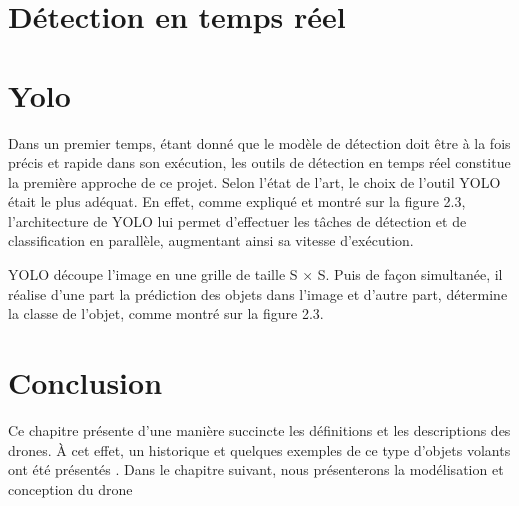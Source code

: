 \section{Détection en temps réel}


\section{Yolo}
Dans un premier temps, étant donné que le modèle de détection doit être à la fois précis et rapide dans son exécution, les outils de détection en temps réel constitue la première approche de ce projet. Selon l’état de l’art, le choix de l’outil YOLO était le plus adéquat. En effet, comme expliqué et montré sur la figure 2.3, l’architecture de YOLO lui permet d’effectuer les tâches de détection et de classification en parallèle, augmentant ainsi sa vitesse d’exécution.

 YOLO découpe l’image en une grille de taille S × S. Puis de façon simultanée, il réalise d’une part la prédiction des objets dans l’image et d’autre part, détermine la classe de l’objet, comme montré sur la figure 2.3.



\section{Conclusion}
Ce chapitre présente d’une manière succincte les définitions et les descriptions des drones. À cet effet, un historique et quelques exemples de ce type d’objets volants ont été présentés  . Dans le chapitre suivant, nous présenterons la modélisation et conception du drone









